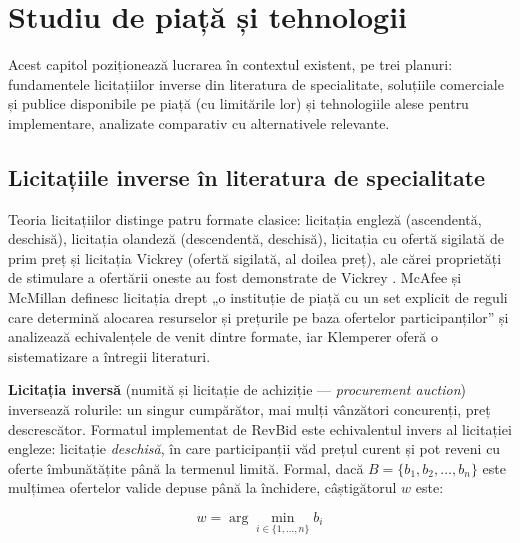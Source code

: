 \chapter{Studiu de piață și tehnologii}
\label{chap:piata}

Acest capitol poziționează lucrarea în contextul existent, pe trei planuri: fundamentele licitațiilor inverse din literatura de specialitate, soluțiile comerciale și publice disponibile pe piață (cu limitările lor) și tehnologiile alese pentru implementare, analizate comparativ cu alternativele relevante.

\section{Licitațiile inverse în literatura de specialitate}

Teoria licitațiilor distinge patru formate clasice: licitația engleză (ascendentă, deschisă), licitația olandeză (descendentă, deschisă), licitația cu ofertă sigilată de prim preț și licitația Vickrey (ofertă sigilată, al doilea preț), ale cărei proprietăți de stimulare a ofertării oneste au fost demonstrate de Vickrey \cite{vickrey1961}. McAfee și McMillan \cite{mcafee1987} definesc licitația drept „o instituție de piață cu un set explicit de reguli care determină alocarea resurselor și prețurile pe baza ofertelor participanților'' și analizează echivalențele de venit dintre formate, iar Klemperer \cite{klemperer1999} oferă o sistematizare a întregii literaturi.

\textbf{Licitația inversă} (numită și licitație de achiziție --- \textit{procurement auction}) inversează rolurile: un singur cumpărător, mai mulți vânzători concurenți, preț descrescător. Formatul implementat de RevBid este echivalentul invers al licitației engleze: licitație \textit{deschisă}, în care participanții văd prețul curent și pot reveni cu oferte îmbunătățite până la termenul limită. Formal, dacă $B = \{b_1, b_2, \ldots, b_n\}$ este mulțimea ofertelor valide depuse până la închidere, câștigătorul $w$ este:

\begin{equation}
\label{eq:castigator}
w = \arg\min_{i \in \{1,\ldots,n\}} b_i
\end{equation}

